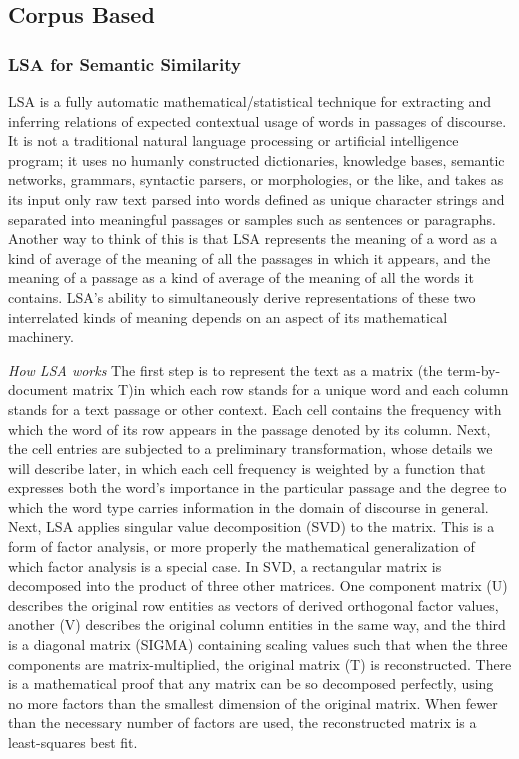 \subsection{Corpus Based}
\subsubsection{LSA for Semantic Similarity}
LSA is a fully automatic mathematical/statistical technique for extracting and inferring relations of expected contextual usage of words in passages of discourse. It is not a traditional natural language processing or artificial intelligence program; it uses no humanly constructed dictionaries, knowledge bases, semantic networks, grammars, syntactic parsers, or morphologies, or the like, and takes as its input only raw text parsed into words defined as unique character strings and separated into meaningful passages or samples such as sentences or paragraphs.
Another way to think of this is that LSA represents the meaning of a word as a kind of average of the meaning of all the passages in which it appears, and the meaning of a passage as a kind of average of the meaning of all the words it contains. LSA's ability to simultaneously derive representations of these two interrelated kinds of meaning depends on an aspect of its mathematical machinery\citep{lsa}.

\textit{How LSA works}
The first step is to represent the text as a matrix (the term-by-document matrix T)in which each row stands for a unique word and each column stands for a text passage or other context. Each cell contains the frequency with which the word of its row appears in the passage denoted by its column. Next, the cell entries are subjected to a preliminary transformation, whose details we will describe later, in which each cell frequency is weighted by a function that expresses both the word's importance in the particular passage and the degree to which the word type carries information in the domain of discourse in general.
Next, LSA applies singular value decomposition (SVD) to the matrix. This is a form of factor analysis, or more properly the mathematical generalization of which factor analysis is a special case. In SVD, a rectangular matrix is decomposed into the product of three other matrices. One component matrix (U) describes the original row entities as vectors of derived orthogonal factor values, another (V) describes the original column entities in the same way, and the third is a diagonal matrix (SIGMA) containing scaling values such that when the three components are matrix-multiplied, the original matrix (T) is reconstructed. 
There is a mathematical proof that any matrix can be so decomposed perfectly, using no more factors than the smallest dimension of the original matrix. When fewer than the necessary number of factors are used, the reconstructed matrix is a least-squares best fit. 

